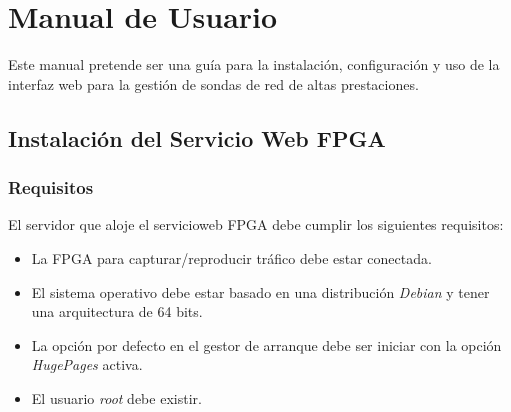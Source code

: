\chapter{Manual de Usuario\label{extra:manual_de_usuario}}

Este manual pretende ser una guía para la instalación, configuración y uso de la interfaz web para la gestión de sondas de red de altas prestaciones.

\section{Instalación del Servicio Web FPGA\label{extra:manual:instalacionfpga}}

\subsection*{Requisitos}
El servidor que aloje el \gls{servicioweb} \gls{FPGA} debe cumplir los siguientes requisitos:
\begin{itemize}
  \item La \gls{FPGA} para capturar/reproducir tráfico debe estar conectada.
  \item El sistema operativo debe estar basado en una distribución \textit{Debian} \cite{debian} y tener una arquitectura de 64 bits.
  \item La opción por defecto en el gestor de arranque debe ser iniciar con la opción \textit{HugePages} activa.
  \item El usuario \textit{root} debe existir.
\end{itemize}

